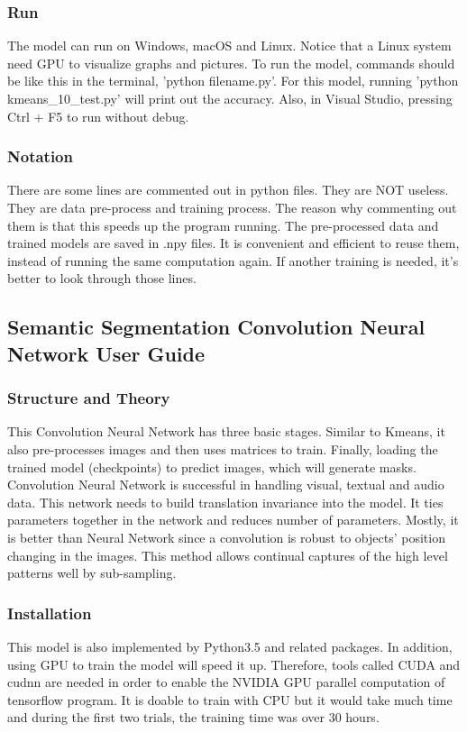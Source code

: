 \documentclass[10pt,journal,compsoc, draftclsnofoot,onecolumn]{IEEEtran}
\begin{document}
\subsubsection{Run}
The model can run on Windows, macOS and Linux. Notice that a Linux system need GPU to visualize graphs and pictures. To run the model, commands should be like this in the terminal, 'python filename.py'. For this model, running 'python kmeans\_10\_test.py' will print out the accuracy. Also, in Visual Studio, pressing Ctrl + F5 to run without debug. 

\subsubsection{Notation}
There are some lines are commented out in python files. They are NOT useless. They are data pre-process and training process. The reason why commenting out them is that this speeds up the program running. The pre-processed data and trained models are saved in .npy files. It is convenient and efficient to reuse them, instead of running the same computation again. If another training is needed, it's better to look through those lines. 


\subsection{Semantic Segmentation Convolution Neural Network User Guide}
\subsubsection{Structure and Theory}
This Convolution Neural Network has three basic stages. Similar to Kmeans, it also pre-processes images and then uses matrices to train. Finally, loading the trained model (checkpoints) to predict images, which will generate masks. \\

\noindent
Convolution Neural Network is successful in handling visual, textual and audio data. This network needs to build translation invariance into the model. It ties parameters together in the network and reduces number of parameters. Mostly, it is better than Neural Network since a convolution is robust to objects' position changing in the images. This method allows continual captures of the high level patterns well by sub-sampling.

\subsubsection{Installation}
This model is also implemented by Python3.5 and related packages. In addition, using GPU to train the model will speed it up. Therefore, tools called CUDA and cudnn are needed in order to enable the NVIDIA GPU parallel computation of tensorflow program. It is doable to train with CPU but it would take much time and during the first two trials, the training time was over 30 hours. \\
\end{document}
